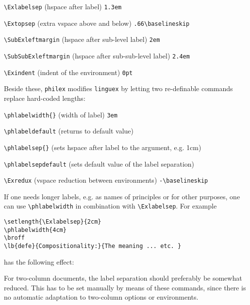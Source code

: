 \documentclass[10pt]{article}
\begin{document}
\begin{trivlist}
\item \verb+\Exlabelsep+ (hspace after label) \hfill  \verb+1.3em+
\item \verb+\Extopsep+ (extra vspace above and below) \hfill \verb+.66\baselineskip+
\item \verb+\SubExleftmargin+ (hspace after sub-level label) \hfill \verb+2em+
\item \verb+\SubSubExleftmargin+ (hspace after sub-sub-level label) \hfill \verb+2.4em+
\item \verb+\Exindent+ (indent of the environment) \hfill \verb+0pt+
\end{trivlist}
	Beside these, \verb+philex+ modifies \verb+linguex+ by letting two re-definable commands replace hard-coded lengths:
	
\begin{trivlist}
\item \verb+\phlabelwidth{}+ (width of label) \hfill \verb+3em+
\item \verb+\phlabeldefault+ (returns to default value)
\item \verb+\phlabelsep{}+ (sets hspace after label to the argument, e.g. 1cm)
\item \verb+\phlabelsepdefault+ (sets default value of the label separation)
\item \verb+\Exredux+ (vspace reduction between environments) \hfill \verb+-\baselineskip+
\end{trivlist}	

If one needs longer labels, e.g. as names of principles or for other purposes, one can use \verb+\phlabelwidth+ in combination with \verb+\Exlabelsep+. For example  

\begin{verbatim}
\setlength{\Exlabelsep}{2cm}
\phlabelwidth{4cm}
\broff
\lb{defe}{Compositionality:}{The meaning ... etc. }
\end{verbatim}
	has the following effect: 
	
	
	
\setlength{\Exlabelsep}{2cm}
\phlabelwidth{4cm}
\broff

	For two-column documents, the label separation should preferably be somewhat reduced. This has to be set manually by means of these commands, since there  is no automatic adaptation to two-column options or environments.
\end{document}
